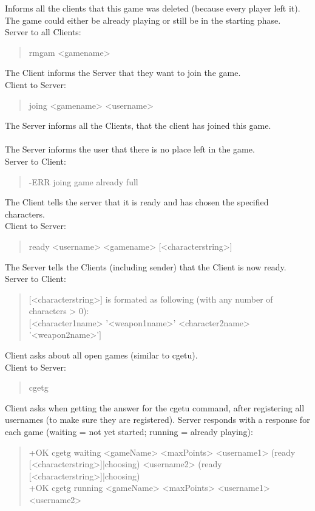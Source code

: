 \documentclass[a4paper,11pt]{article}
\begin{document}
Informs all the clients that this game was deleted (because every player left it).	The game could either be already playing or still be in the starting phase.\\
Server to all Clients:
\begin{quote}
  rmgam <gamename>
\end{quote}

\noindent
The Client informs the Server that they want to join the game.\\
Client to Server:
\begin{quote}
  joing <gamename> <username>
\end{quote}

\noindent
The Server informs all the Clients, that the client has joined this game.\\\\

The Server informs the user that there is no place left in the game.\\
Server to Client:
\begin{quote}
  -ERR joing game already full
\end{quote}

\noindent
The Client tells the server that it is ready and has chosen the specified characters.\\
Client to Server:
\begin{quote}
  ready <username> <gamename> [<characterstring>]
\end{quote}

\noindent
The Server tells the Clients (including sender) that the Client is now ready.
Server to Client:
\begin{quote}
  $[$<characterstring>$]$  is formated as following (with any number of characters > 0):\\
	$[$<character1name> '<weapon1name>' <character2name> '<weapon2name>'$]$ 
\end{quote}	

\noindent
Client asks about all open games (similar to cgetu).\\
Client to Server:
\begin{quote}
  cgetg
\end{quote}

\noindent	
Client asks when getting the answer for the cgetu command, after registering all usernames (to make sure they are registered).
Server responds with a response for each game (waiting = not yet started; running = already playing):
\begin{quote}
  +OK cgetg waiting <gameName> <maxPoints> <username1> (ready [<characterstring>]|choosing) <username2> (ready [<characterstring>]|choosing)\\
  +OK cgetg running <gameName> <maxPoints> <username1> <username2>
\end{quote}
\end{document}
